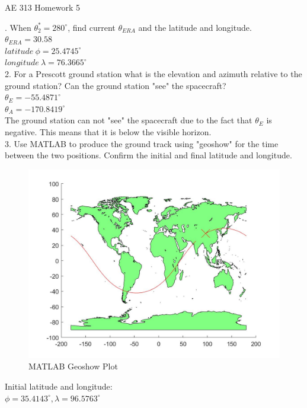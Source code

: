 \documentclass[hidelinks,12pt]{article}
\begin{document}

\begin{center}
\large AE 313 Homework 5
\end{center}
. When $\theta^*_2 = 280^\circ$, find current $\theta_{ERA}$ and the latitude and longitude.\\
$\theta_{ERA} = 30.58$\\
$latitude~\phi = 25.4745^\circ$\\
$longitude~\lambda = 76.3665^\circ$\\
\vspace{5px}
2. For a Prescott ground station what is the elevation and azimuth relative to the ground station? Can the ground station "see" the spacecraft?\\
$\theta_E = -55.4871^\circ$\\
$\theta_A = -170.8419^\circ$\\
The ground station can not "see" the spacecraft due to the fact that $\theta_E$ is negative. This means that it is below the visible horizon.\\
\vspace{5px}
3. Use MATLAB to produce the ground track using "geoshow" for the time between the two positions. Confirm the initial and final latitude and longitude.\\
\begin{figure}[!htb]
  \center
  \includegraphics[scale=0.3]{MATLAB}
  \caption{MATLAB Geoshow Plot}
  \label{}
\end{figure}
Initial latitude and longitude:\\
$\phi = 35.4143^\circ, \lambda = 96.5763^\circ$\\
\end{document}
